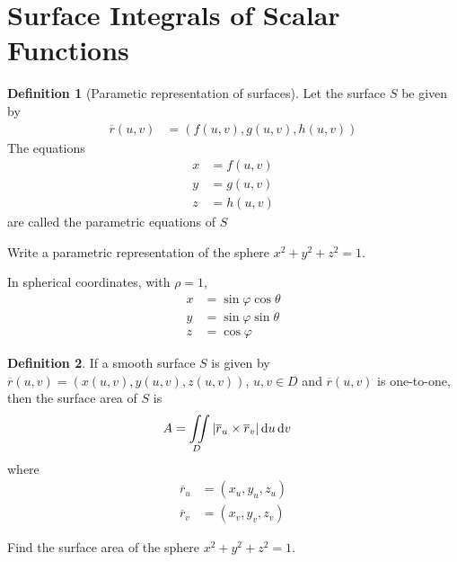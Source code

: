 \documentclass[fleqn, a4paper, 12pt, twoside]{article}
\theoremstyle{definition}
\newtheorem{definition}{Definition}
\theoremstyle{theorem}
\begin{document}
{\section{Surface Integrals of Scalar Functions}

\begin{definition}[Parametic representation of surfaces]
	Let the surface $S$ be given by
	\begin{align*}
		\overline{r}(u,v) & = \left( f(u,v) , g(u,v) , h(u,v) \right)
	\end{align*}
	The equations
	\begin{align*}
		x & = f(u,v) \\
		y & = g(u,v) \\
		z & = h(u,v)
	\end{align*}
	are called the parametric equations of $S$
\end{definition}

\begin{question}
	Write a parametric representation of the sphere $x^2 + y^2 + z^2 = 1$.
\end{question}

\begin{solution}
	In spherical coordinates, with $\rho = 1$,
	\begin{align*}
		x & = \sin \varphi \cos \theta \\
		y & = \sin \varphi \sin \theta \\
		z & = \cos \varphi
	\end{align*}
\end{solution}

\begin{definition}
	If a smooth surface $S$ is given by $\overline{r}(u,v) = \left( x(u,v) , y(u,v) , z(u,v) \right)$, $u,v \in D$ and $\overline{r}(u,v)$ is one-to-one, then the surface area of $S$ is
	\begin{align*}
		A & = \iint\limits_{D} \left| \overline{r}_u \times \overline{r}_v \right| \dif u \dif v
	\end{align*}
	where
	\begin{align*}
		\overline{r}_u & = (x_u, y_u, z_u) \\
		\overline{r}_v & = (x_v, y_v, z_v)
	\end{align*}
\end{definition}

\begin{question}
	Find the surface area of the sphere $x^2 + y^2 + z^2 = 1$.
\end{question}

}
\end{document}
